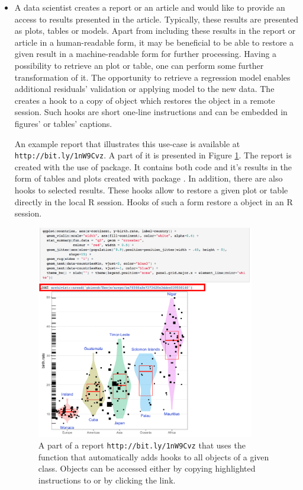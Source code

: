 \documentclass[nojss]{jss}\usepackage[]{graphicx}\usepackage[]{color}
\begin{document}
\begin{itemize}
\item A data {scientist} creates a report or an article and would like to provide an access to results presented in the article. Typically, these results are presented as plots, tables or models. Apart from including these results in the report or article in a human-readable form, it may be beneficial to be able to restore a given result in a machine-readable form for further processing. Having a possibility to retrieve an   plot or table, one can perform some further transformation of it. The opportunity to retrieve a regression model enables additional residuals' validation or applying model to the new data. The  creates a hook to a copy of  object which restores the object in a remote  session. Such hooks are short one-line instructions and can be embedded in figures' or tables' captions. 

An example report that illustrates this use-case is available at \texttt{http://bit.ly/1nW9Cvz}. A part of it is presented in Figure \ref{figExample3}. The report is created with the use of  package. It contains both  code and it's results in the form of tables and plots created with  package \citep[see][]{ggplot2}. In addition, there are also hooks to selected results. These hooks allow to restore a given plot or table directly in the local R session. Hooks of such a form restore a  object in an R session.



\begin{figure}[b!h]
\centering
\includegraphics[width=0.9\textwidth]{Figures/addHooks.png}
\caption{\label{figExample3}{A part of a  report \texttt{http://bit.ly/1nW9Cvz} that uses the  function that automatically adds  hooks to all objects of a given class. Objects can be accessed either by copying highlighted  instructions to  or by clicking the link.}}
\end{figure}


\end{itemize}
\end{document}
